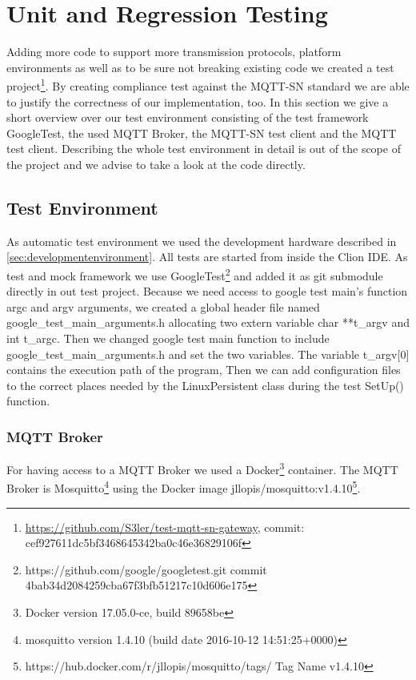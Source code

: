 \section{Unit and Regression Testing}\label{sec:unitandregressiontesting}
Adding more code to support more transmission protocols, platform environments as well as to be sure not breaking existing code we created a test project\footnote{\url{https://github.com/S3ler/test-mqtt-sn-gateway}, commit: cef927611dc5bf3468645342ba0c46e36829106f}. By creating compliance test against the MQTT-SN standard we are able to justify the correctness of our implementation, too.
In this section we give a short overview over our test environment consisting of the test framework GoogleTest, the used MQTT Broker, the MQTT-SN test client and the MQTT test client.
Describing the whole test environment in detail is out of the scope of the project and we advise to take a look at the code directly.
\subsection{Test Environment}\label{sec:testenvironment}
As automatic test environment we used the development hardware described in \autoref{sec:developmentenvironment}.
All tests are started from inside the Clion IDE.
As test and mock framework we use GoogleTest\footnote{https://github.com/google/googletest.git commit 4bab34d2084259cba67f3bfb51217c10d606e175} and added it as git submodule directly in out test project.
Because we need access to google test main's function argc and argv arguments, we created a global header file named google\_test\_main\_arguments.h allocating two extern variable char **t\_argv and int t\_argc.
Then we changed google test main function to include google\_test\_main\_arguments.h and set the two variables. 
The variable t\_argv[0] contains the execution path of the program,
Then we can add configuration files to the correct places needed by the LinuxPersistent class during the test SetUp() function.
\subsubsection{MQTT Broker}
For having access to a MQTT Broker we used a Docker\footnote{Docker version 17.05.0-ce, build 89658be} container. The MQTT Broker is Mosquitto\footnote{mosquitto version 1.4.10 (build date 2016-10-12 14:51:25+0000)} using the Docker image jllopis/mosquitto:v1.4.10\footnote{ https://hub.docker.com/r/jllopis/mosquitto/tags/ Tag Name v1.4.10}.
